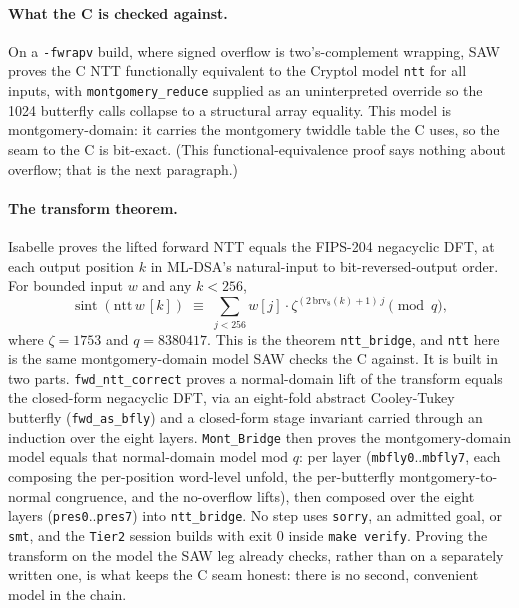\documentclass[11pt]{article}
\newcommand{\code}[1]{\texttt{#1}}
\begin{document}
\paragraph{What the C is checked against.} On a \code{-fwrapv} build, where signed overflow is
two's-complement wrapping, SAW proves the C NTT functionally equivalent to the Cryptol model \code{ntt}
for all inputs, with \code{montgomery\_reduce} supplied as an uninterpreted override so the 1024 butterfly
calls collapse to a structural array equality. This model is montgomery-domain: it carries the montgomery
twiddle table the C uses, so the seam to the C is bit-exact. (This functional-equivalence proof says
nothing about overflow; that is the next paragraph.)

\paragraph{The transform theorem.} Isabelle proves the lifted forward NTT equals the FIPS-204 negacyclic
DFT, at each output position $k$ in ML-DSA's natural-input to bit-reversed-output order. For bounded
input $w$ and any $k < 256$,
\[
  \operatorname{sint}(\mathrm{ntt}\,w\,[k]) \;\equiv\;
  \sum_{j<256} w[j]\cdot \zeta^{(2\,\mathrm{brv}_8(k)+1)\,j} \pmod q,
\]
where $\zeta = 1753$ and $q = 8380417$.
This is the theorem \code{ntt\_bridge}, and \code{ntt} here is the same montgomery-domain model SAW checks
the C against. It is built in two parts. \code{fwd\_ntt\_correct} proves a normal-domain lift of the
transform equals the closed-form negacyclic DFT, via an eight-fold abstract Cooley-Tukey butterfly
(\code{fwd\_as\_bfly}) and a closed-form stage invariant carried through an induction over the eight
layers. \code{Mont\_Bridge} then proves the montgomery-domain model equals that normal-domain model mod
$q$: per layer (\code{mbfly0}..\code{mbfly7}, each composing the per-position word-level unfold, the
per-butterfly montgomery-to-normal congruence, and the no-overflow lifts), then composed over the eight
layers (\code{pres0}..\code{pres7}) into \code{ntt\_bridge}. No step uses \code{sorry}, an admitted goal,
or \code{smt}, and the \code{Tier2} session builds with exit 0 inside \code{make verify}. Proving the
transform on the model the SAW leg already checks, rather than on a separately written one, is what keeps
the C seam honest: there is no second, convenient model in the chain.
\end{document}
